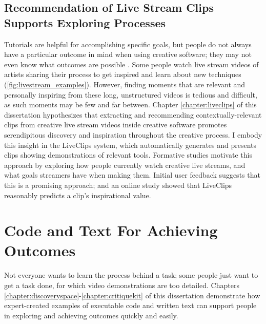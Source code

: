\subsection{Recommendation of Live Stream Clips Supports Exploring Processes}
Tutorials are helpful for accomplishing specific goals, but people do not always have a particular outcome in mind when using creative software; they may not even know what outcomes are possible \cite{Matejka2009, Chaudhuri2010, ODonovan2015}. Some people watch live stream videos of artists sharing their process to get inspired and learn about new techniques (\autoref{fig:livestream_examples}). However, finding moments that are relevant and personally inspiring from these long, unstructured videos is tedious and difficult, as such moments may be few and far between. Chapter \ref{chapter:liveclips} of this dissertation hypothesizes that extracting and recommending contextually-relevant clips from creative live stream videos inside creative software promotes serendipitous discovery and inspiration throughout the creative process. I embody this insight in the LiveClips system, which automatically generates and presents clips showing demonstrations of relevant tools. Formative studies motivate this approach by exploring how people currently watch creative live streams, and what goals streamers have when making them. Initial user feedback suggests that this is a promising approach; and an online study showed that LiveClips reasonably predicts a clip's inspirational value.

\section{Code and Text For Achieving Outcomes}
Not everyone wants to learn the process behind a task; some people just want to get a task done, for which video demonstrations are too detailed. Chapters \ref{chapter:discoveryspace}-\ref{chapter:critiquekit} of this dissertation demonstrate how expert-created examples of executable code and written text can support people in exploring and achieving outcomes quickly and easily. 

